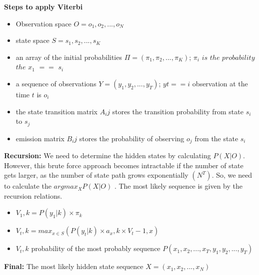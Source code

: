 \textbf{Steps to apply Viterbi}
\begin{itemize}
\item Observation space $O =  {o_1,o_2,...,o_N}$
\item state space $S = {s_1,s_2,...,s_K}$
\item an array of the initial probabilities $\Pi = (\pi_1, \pi_2,...,\pi_K)$; $\pi_i$ $is$ $the$ $probability$ $the$ $x_1$ $==$ $s_i$
\item a sequence of observations $Y = (y_1,y_2,...,y_T)$; $yt == i$ observation at the time $t$ is $o_i$
\item the state transition matrix $A_ij$ stores the transition probability from state $s_i$ to $s_j$
\item emission matrix $B_ij$ stores the probability of observing $o_j$ from the state $s_i$
\end{itemize}  
\textbf{Recursion:}
We need to determine the hidden states by calculating $P(X|O)$. However, this brute force approach becomes intractable if the number of state gets larger, as the number of state path grows exponentially $(N^T)$. So, we need to calculate the $argmax_X P(X|O)$ . The most likely sequence is given by the recursion relations.
\begin{center}
\begin{itemize}
\item $V_1,k = P (y_1|k) \times \pi_k$
\item $V_t,k = max_{x \in S} (P (y_t|k) \times a_x,k \times V_t-1,x)$
\item $V_t,k$ probability of the most probably sequence $P (x_1, x_2,...,x_T, y_1,y_2,...,y_T)$
\end{itemize}
\end{center}
\textbf{Final:}
The most likely hidden state sequence $X = (x_1,x_2,...,x_N)$ 
